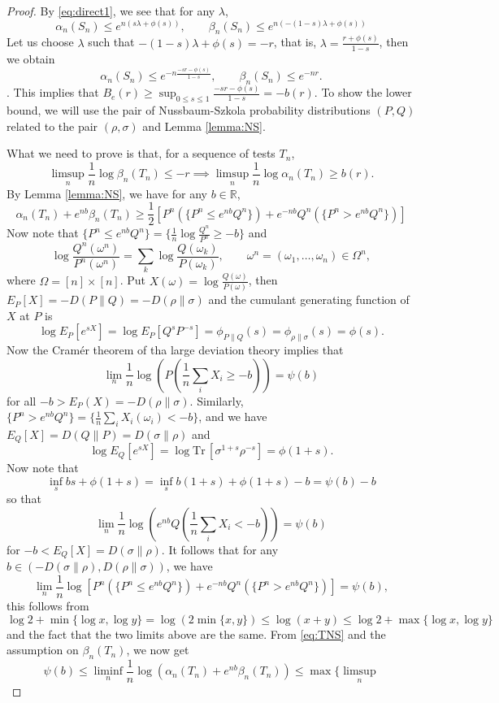 \documentclass[12pt]{article}
\theoremstyle{definition}
\theoremstyle{remark}
\def \Tr{\mathrm{Tr}\,}
\begin{document}
\begin{proof} By \eqref{eq:direct1}, we see that for any $\lambda$,
\[
\alpha_n(S_n)\le e^{n(s\lambda+\phi(s))},\qquad \beta_n(S_n)\le
e^{n(-(1-s)\lambda+\phi(s))}
\]
Let us choose $\lambda$ such that $-(1-s)\lambda+\phi(s)=-r$, that is,
$\lambda=\frac{r+\phi(s)}{1-s}$, then we obtain
\[
\alpha_n(S_n)\le e^{-n\frac{-sr-\phi(s)}{1-s}},\qquad \beta_n(S_n)\le e^{-nr}.
\].
This implies that $B_e(r)\ge \sup_{0\le s\le 1}\frac{-sr-\phi(s)}{1-s}=-b(r)$. To show the lower
bound, we will use the pair of Nussbaum-Szkola probability distributions $(P,Q)$ related to the pair
$(\rho,\sigma)$ and Lemma \ref{lemma:NS}.  

What we need to prove is that, for a sequence of tests $T_n$,
\[
\limsup_n \frac1n\log\beta_n(T_n)\le -r \implies \limsup_n\frac1n\log\alpha_n(T_n)\ge
b(r).
\]
By Lemma \ref{lemma:NS}, we have for any $b\in \mathbb R$,
\begin{equation}\label{eq:TNS}
\alpha_n(T_n)+e^{nb}\beta_n(T_n)\ge \frac12[P^n(\{P^n\le
e^{nb}Q^n\})+e^{-nb}Q^n(\{P^n>e^{nb}Q^n\})]
\end{equation}
Now note that $\{P^n\le e^{nb}Q^n\}=\{\frac1n \log\frac{Q^n}{P^n}\ge -b\}$ and
\[
\log\frac{Q^n(\omega^n)}{P^n(\omega^n)}=\sum_k \log\frac{ Q(\omega_k)}{P(\omega_k)},\qquad
\omega^n=(\omega_1,\dots,\omega_n)\in \Omega^n,
\]
where $\Omega=[n]\times[n]$. Put $X(\omega)=\log\frac{Q(\omega)}{P(\omega)}$, then
$E_P[X]=-D(P\|Q)=-D(\rho\|\sigma)$ and the
cumulant generating function of $X$ at $P$ is
\[
\log E_P[e^{sX}]=\log E_P[Q^sP^{-s}]=\phi_{P\|Q}(s)=\phi_{\rho\|\sigma}(s)=\phi(s).
\]
Now the Cram\'er theorem of tha large deviation theory implies that
\[
\lim_n\frac1n\log(P(\frac1n \sum_iX_i\ge -b))=\psi(b)
\]
for all $-b>E_P(X)=-D(\rho\|\sigma)$. Similarly,  $\{P^n> e^{nb}Q^n\}=\{\frac1n\sum_i
X_i(\omega_i)< -b\}$, and  we have $E_Q[X]=D(Q\|P)=D(\sigma\|\rho)$ and
\[
\log E_Q[e^{sX}]=\log\Tr[\sigma^{1+s}\rho^{-s}]=\phi(1+s).
\]
Now note that 
\[
\inf_s bs+\phi(1+s)=\inf_s b(1+s)+\phi(1+s)-b=\psi(b)-b
\]
so that 
\[
\lim_n \frac1n \log(e^{nb}Q(\frac1n \sum_iX_i<-b))=\psi(b)
\]
for $-b<E_Q[X]=D(\sigma\|\rho)$.  It follows that for any $b\in
(-D(\sigma\|\rho),D(\rho\|\sigma))$, we have 
\[
\lim_n \frac1n\log [P^n(\{P^n\le
e^{nb}Q^n\})+e^{-nb}Q^n(\{P^n>e^{nb}Q^n\})]=\psi(b),
\]
this follows from
\[
\log2 +\min\{\log x,\log y\}=\log(2\min\{x,y\})\le \log(x+y)\le\log 2+\max\{\log x,\log y\}
\]
and  the fact that the two limits above are the same. From \eqref{eq:TNS} and the assumption on
$\beta_n(T_n)$, we now get 
\[
\psi(b)\le \liminf_n \frac1n \log(\alpha_n(T_n)+e^{nb}\beta_n(T_n))\le \max\{\limsup_n
\]
\end{proof}
\end{document}
